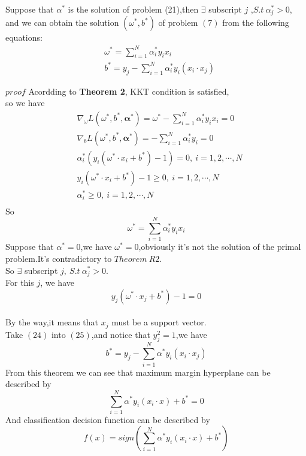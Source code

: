 \begin{theorem}
Suppose that $\alpha^*$ is the solution of problem (21),then $\exists$ subscript $j$ ,$S.t\ \alpha_{j}^*>0$, and we can obtain the solution $(\omega^*,b^*)$ of problem $(7)$ from the following equations:
\begin{equation}
\begin{split}
&\omega^*=\sum\limits_{i=1}^{N}\alpha_{i}^*y_{i}x_{i}
\\&b^*=y_{j}-\sum\limits_{i=1}^{N}\alpha_{i}^*y_{i}(x_{i}\cdot x_{j})
\end{split}
\end{equation}
\end{theorem}

$proof$ Acordding to \textbf{Theorem 2}, KKT condition is satisfied,
\\so we have
\begin{equation}
\begin{split}
&\nabla_{\omega} L(\omega^*, b^*, \bm \alpha^*)=\omega^*-\sum\limits_{i=1}^{N}\alpha_{i}^*y_{i}x_{i}=0\\
&\nabla_{b} L(\omega^*, b^*, \bm \alpha^*)=-\sum\limits_{i=1}^{N}\alpha_{i}^*y_{i}=0\\
&\alpha_{i}^*(y_{i}(\omega^*\cdot x_{i}+b^*)-1)= 0,\ i=1,2,\cdots,N\\
&y_{i}(\omega^*\cdot x_{i}+b^*)-1\geqslant 0,\ i=1,2,\cdots,N\\
&\alpha_{i}^*\geqslant 0,\ i=1,2,\cdots,N\\
\end{split}
\end{equation}
So
\begin{equation}
\omega^*=\sum\limits_{i=1}^{N}\alpha_{i}^*y_{i}x_{i}
\end{equation}
Suppose that $\alpha^*=0$,we have $\omega^*=0$,obviously it's not the solution of the primal problem.It's contradictory to $Theorem\ R2$.
\\So $\exists$ subscript $j,\ S.t\ \alpha_{j}^*>0$.
\\For this $j$, we have
\begin{equation}
y_{j}(\omega^*\cdot x_{j}+b^*)-1=0
\end{equation}
\\By the way,it means that $x_{j}$ must be a support vector.
\\Take $(24)$ into $(25)$,and notice that $y_{j}^2=1$,we have
\begin{equation}
b^*=y_{j}-\sum\limits_{i=1}^{N}\alpha^*y_{i}(x_{i}\cdot x_{j})
\end{equation}
From this theorem we can see that maximum margin hyperplane can be described by
\begin{equation}
\sum\limits_{i=1}^{N}\alpha^*y_{i}(x_{i}\cdot x)+b^*=0
\end{equation}
And classification decision function can be described by
\begin{equation}
f(x)=sign(\sum\limits_{i=1}^{N}\alpha^*y_{i}(x_{i}\cdot x)+b^*)
\end{equation}



